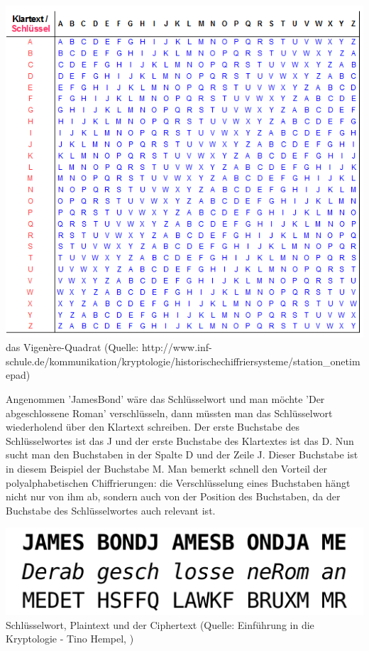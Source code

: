 \documentclass[12pt,a4paper]{report}
\begin{document}
\begin{onehalfspace}
\begin{center}
\includegraphics[scale=0.5]{img/vigere_quadrat.png}\\
das Vigenère-Quadrat (Quelle: http://www.inf-schule.de/kommunikation/kryptologie/historischechiffriersysteme/station\_onetimepad)
\end{center}

Angenommen 'JamesBond' wäre das Schlüsselwort und man möchte 'Der abgeschlossene Roman' verschlüsseln, dann müssten man das Schlüsselwort wiederholend über den Klartext schreiben. Der erste Buchstabe des Schlüsselwortes ist das J und der erste Buchstabe des Klartextes ist das D. Nun sucht man den Buchstaben in der Spalte D und der Zeile J. Dieser Buchstabe ist in diesem Beispiel der Buchstabe M. Man bemerkt schnell den Vorteil der polyalphabetischen Chiffrierungen: die Verschlüsselung eines Buchstaben hängt nicht nur von ihm ab, sondern auch von der Position des Buchstaben, da der Buchstabe des Schlüsselwortes auch relevant ist.

\begin{center}
\includegraphics[scale=0.5]{img/vingere.png}\\
Schlüsselwort, Plaintext und der Ciphertext (Quelle: Einführung in die Kryptologie - Tino Hempel, \cite{krypto01})
\end{center}


\end{onehalfspace}
\end{document}
